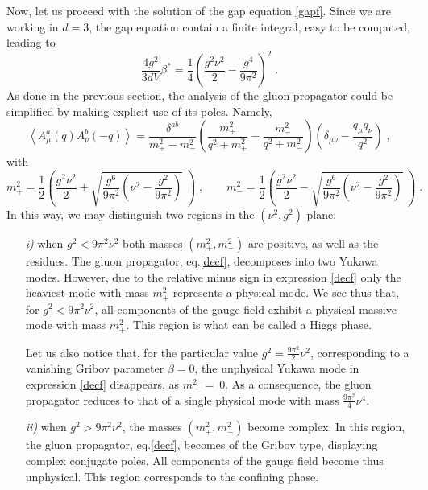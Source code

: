 Now, let us proceed with the solution  of the gap equation \eqref{gapf}. Since we are working in $d=3$, the gap equation contain a finite integral, easy to be computed, leading to
\begin{equation}
 \frac{4g^2}{3dV} \beta^{\ast} = \frac{1}{4} \left( \frac{g^2\nu^2}{2} -  \frac{g^4}{9\pi^2} \right)^2 \;. \label{solf}
\end{equation}
As done in the previous section, the analysis of the gluon propagator could be simplified by making explicit use of its poles. Namely,
\begin{equation}
\left\langle A_{\mu }^{a}(q)A_{\nu }^{b}(-q)\right\rangle
=  \frac{\delta^{ab}}{m^2_+-m^2_-}\left(  \frac{m^2_+}{q^2+m^2_+} -\frac{m^2_{-}}{q^2+m^2_-}  \right)
\left( \delta _{\mu\nu }-\frac{q_{\mu }q_{\nu }}{q^{2}}\right)  \;,  \label{decf}
\end{equation}
with
\begin{equation}
m^2_+ = \frac{1}{2} \left( \frac{g^2\nu^2}{2}  + \sqrt{\frac{g^6}{9\pi^2} \left(\nu^2-\frac{g^2}{9\pi^2}\right)}\; \right) \;,  \qquad m^2_- = \frac{1}{2} \left( \frac{g^2\nu^2}{2}  - \sqrt{\frac{g^6}{9\pi^2} \left(\nu^2-\frac{g^2}{9\pi^2}\right)} \;\right)
\label{massesf} \;.
\end{equation}
In this way, we may distinguish two regions in the $(\nu^2,g^2)$ plane:
\begin{itemize}
\item[\it i)] when $g^2 < 9\pi^2 \nu^2$ both masses $(m^2_+,m^2_-)$ are positive, as well as the residues. The gluon propagator, eq.\eqref{decf}, decomposes into two Yukawa modes. However, due to the relative minus sign in expression \eqref{decf} only the heaviest mode with mass $m^2_+$ represents a physical mode. We see thus that, for $g^2 < 9\pi^2 \nu^2$, all components of the gauge field exhibit a physical massive mode with mass $m^2_+$. This region is what can be called a Higgs phase. 

Let us also notice that, for the particular value $g^2=\frac{9\pi^2}{2}\nu^2$, corresponding to a vanishing Gribov parameter $\beta=0$, the unphysical Yukawa mode in expression  \eqref{decf} disappears, as $m^2_-~=~0$. As a consequence, the gluon propagator reduces to that of a single physical mode with mass $\frac{9\pi^2}{4}\nu^4$.
\item[\it ii)] when $g^2> 9 \pi^2 \nu^2$, the masses $(m^2_+,m^2_-)$ become complex. In this region, the gluon propagator, eq.\eqref{decf}, becomes of the Gribov type, displaying complex conjugate poles. All components of the gauge field become thus unphysical. This region corresponds to the confining phase.
\end{itemize}
